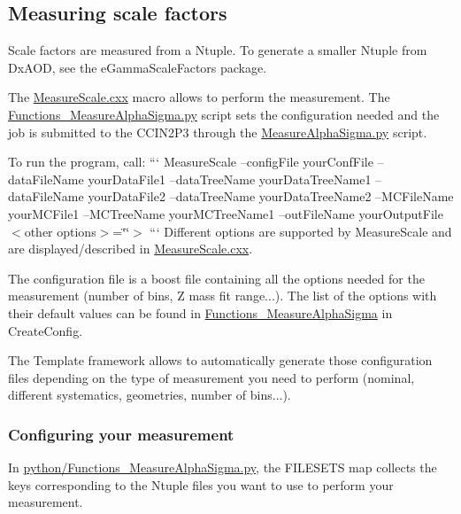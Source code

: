 \subsection*{Measuring scale factors }

Scale factors are measured from a Ntuple. To generate a smaller Ntuple from Dx\+A\+O\+D, see the e\+Gamma\+Scale\+Factors package.

The \hyperlink{MeasureScale_8cxx}{Measure\+Scale.\+cxx} macro allows to perform the measurement. The \hyperlink{Functions__MeasureAlphaSigma_8py}{Functions\+\_\+\+Measure\+Alpha\+Sigma.\+py} script sets the configuration needed and the job is submitted to the C\+C\+I\+N2\+P3 through the \hyperlink{MeasureAlphaSigma_8py}{Measure\+Alpha\+Sigma.\+py} script.

To run the program, call\+: ``` Measure\+Scale --config\+File your\+Conf\+File --data\+File\+Name your\+Data\+File1 --data\+Tree\+Name your\+Data\+Tree\+Name1 --data\+File\+Name your\+Data\+File2 --data\+Tree\+Name your\+Data\+Tree\+Name2 --M\+C\+File\+Name your\+M\+C\+File1 --M\+C\+Tree\+Name your\+M\+C\+Tree\+Name1 --out\+File\+Name your\+Output\+File $<$other options$>$=\char`\"{}\char`\"{}$>$ ``` Different options are supported by Measure\+Scale and are displayed/described in \hyperlink{MeasureScale_8cxx}{Measure\+Scale.\+cxx}.

The configuration file is a boost file containing all the options needed for the measurement (number of bins, Z mass fit range...). The list of the options with their default values can be found in \hyperlink{namespaceFunctions__MeasureAlphaSigma}{Functions\+\_\+\+Measure\+Alpha\+Sigma} in Create\+Config.

The Template framework allows to automatically generate those configuration files depending on the type of measurement you need to perform (nominal, different systematics, geometries, number of bins...).

\subsubsection*{Configuring your measurement}


\begin{DoxyItemize}
\item In \hyperlink{Functions__MeasureAlphaSigma_8py}{python/\+Functions\+\_\+\+Measure\+Alpha\+Sigma.\+py}, the F\+I\+L\+E\+S\+E\+T\+S map collects the keys corresponding to the Ntuple files you want to use to perform your measurement.
\end{DoxyItemize}

